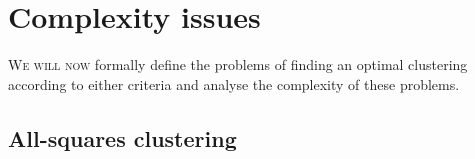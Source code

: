 

\clearpage
\section{Complexity issues}
\label{sec:complexity-issues}

\textsc{We will now} formally define the problems of finding an optimal
clustering according to either criteria and analyse the complexity of these
problems.

\subsection{All-squares clustering}
\label{sec:all-squar-clust}

